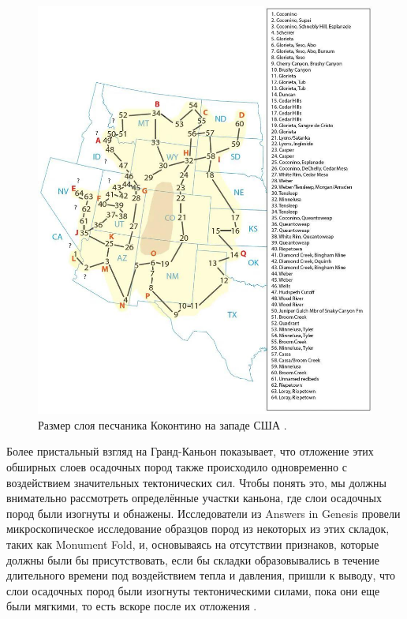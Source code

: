 \documentclass[10pt,twocolumn,letterpaper]{article}
\begin{document}
\begin{figure}[t]
\begin{center}
   \includegraphics[width=1\linewidth]{coconino.jpg}
\end{center}
   \caption{Размер слоя песчаника Коконтино на западе США \cite{21}.}
\label{fig:3}
\label{fig:onecol}
\end{figure}

Более пристальный взгляд на Гранд-Каньон показывает, что отложение этих обширных слоев осадочных пород также происходило одновременно с воздействием значительных тектонических сил. Чтобы понять это, мы должны внимательно рассмотреть определённые участки каньона, где слои осадочных пород были изогнуты и обнажены. Исследователи из Answers in Genesis \cite{42} провели микроскопическое исследование образцов пород из некоторых из этих складок, таких как Monument Fold, и, основываясь на отсутствии признаков, которые должны были бы присутствовать, если бы складки образовывались в течение длительного времени под воздействием тепла и давления, пришли к выводу, что слои осадочных пород были изогнуты тектоническими силами, пока они еще были мягкими, то есть вскоре после их отложения \cite{43}.
\end{document}
